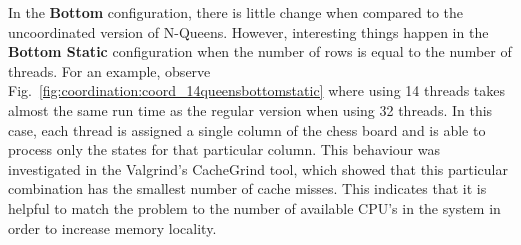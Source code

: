 In the \textbf{Bottom} configuration, there is little change when compared to
the uncoordinated version of N-Queens. However, interesting things happen in the
\textbf{Bottom Static} configuration when the number of rows is equal to the
number of threads. For an example, observe
Fig.~\ref{fig:coordination:coord_14queensbottomstatic} where using 14 threads
takes almost the same run time as the regular version when using 32 threads.  In
this case, each thread is assigned a single column of the chess board and is
able to process only the states for that particular column. This behaviour was
investigated in the Valgrind's CacheGrind tool, which showed that this
particular combination has the smallest number of cache misses. This indicates
that it is helpful to match the problem to the number of available CPU's in the
system in order to increase memory locality.


